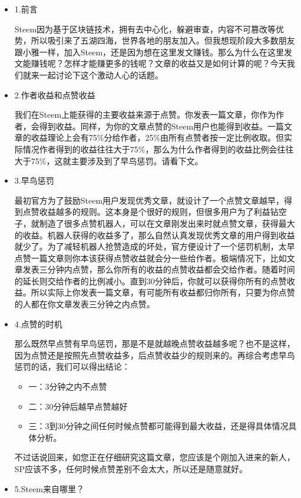 \documentclass[]{ctexbook}
\begin{document}
\begin{itemize}
\item
  1.前言

  Steem因为基于区块链技术，拥有去中心化，躲避审查，内容不可篡改等优势，所以吸引来了五湖四海，世界各地的朋友加入。但我想现阶段大多数朋友跟小雅一样，加入Steem，还是因为想在这里发文赚钱。那么为什么在这里发文能赚钱呢？怎样才能赚更多的钱呢？文章的收益又是如何计算的呢？今天我们就来一起讨论下这个激动人心的话题。
\item
  2.作者收益和点赞收益

  我们在Steem上能获得的主要收益来源于点赞。你发表一篇文章，你作为作者，会得到收益。同样，为你的文章点赞的Steem用户也能得到收益。一篇文章的收益理论上会有75\%分给作者，25\%由所有点赞者按一定比例收取。但实际情况作者得到的收益往往大于75\%，那么为什么作者得到的收益比例会往往大于75\%，这就主要涉及到了早鸟惩罚。请看下文。
\item
  3.早鸟惩罚

  最初官方为了鼓励Steem用户发现优秀文章，就设计了一个点赞文章越早，得到点赞收益越多的规则。这本身是个很好的规则，但很多用户为了利益钻空子，就制造了很多点赞机器人，可以在文章刚发出来时就点赞文章，获得最大的收益。机器人获得的收益多了，那么自然认真发现优秀文章的用户得到收益就少了。为了减轻机器人抢赞造成的坏处，官方便设计了一个惩罚机制，太早点赞一篇文章则你本该获得点赞收益就会分一些给作者。极端情况下，比如文章发表三分钟内点赞，那么你所有的收益的点赞收益都会交给作者。随着时间的延长则交给作者的比例减小。直到30分钟后，你就可以获得你所有的点赞收益。所以实际上你发表一篇文章，有可能所有收益都归你所有，只要为你点赞的人都在你文章发表三分钟之内点赞。
\item
  4.点赞的时机

  那么既然早点赞有早鸟惩罚，那是不是就越晚点赞收益越多呢？也不是这样，因为点赞还是按照先点赞收益多，后点赞收益少的规则来的。再综合考虑早鸟惩罚的话，我们可以得出结论：

  \begin{itemize}
  \item
    一：3分钟之内不点赞
  \item
    二：30分钟后越早点赞越好
  \item
    三：3到30分钟之间任何时候点赞都可能得到最大收益，还是得具体情况具体分析。
  \end{itemize}

  不过话说回来，如您正在仔细研究这篇文章，您应该是个刚加入进来的新人，SP应该不多，任何时候点赞差别不会太大，所以还是随意就好。
\item
  5.Steem来自哪里？


\end{itemize}
\end{document}
